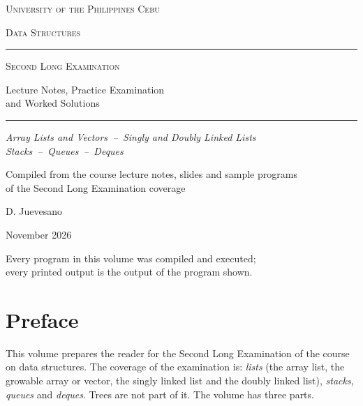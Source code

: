\begin{titlepage}
\centering
\vspace*{3cm}
{\large\textsc{University of the Philippines Cebu}\par}
\vspace{4pt}
{\textsc{Data Structures}\par}
\vspace{2cm}
\rule{0.65\linewidth}{0.4pt}\par\vspace{18pt}
{\Huge\textsc{Second Long Examination}\par}
\vspace{14pt}
{\Large Lecture Notes, Practice Examination\\ and Worked Solutions\par}
\vspace{18pt}
\rule{0.65\linewidth}{0.4pt}\par
\vspace{2cm}
{\large\itshape Array Lists and Vectors \,--\, Singly and Doubly Linked Lists\\[2pt]
Stacks \,--\, Queues \,--\, Deques\par}
\vspace{2cm}
{Compiled from the course lecture notes, slides and sample programs\\
of the Second Long Examination coverage\par}
\vspace{2cm}
{\large D. Juevesano\par}
\vspace{6pt}
{November 2026\par}
\vfill
{\small Every program in this volume was compiled and executed;\\
every printed output is the output of the program shown.\par}
\end{titlepage}

\chapter*{Preface}

This volume prepares the reader for the Second Long Examination of the course on data
structures. The coverage of the examination is: \emph{lists} (the array list, the
growable array or vector, the singly linked list and the doubly linked list),
\emph{stacks}, \emph{queues} and \emph{deques}. Trees are not part of it. The volume
has three parts.

